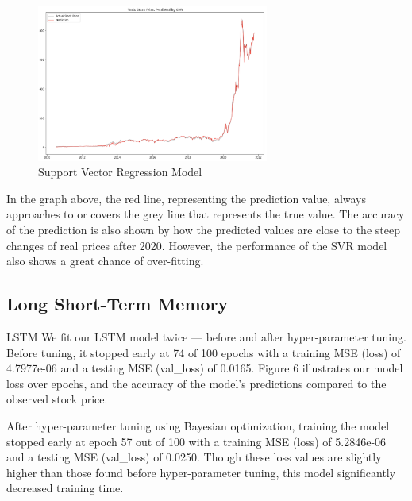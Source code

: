 \documentclass[12pt,a4paper]{article}
\begin{document}
\begin{figure}[h]
\caption{Support Vector Regression Model}
\centering
\includegraphics[width=3in]{./Figures/SVM.png}
\end{figure}

In the graph above, the red line, representing the prediction value, always approaches to or covers the grey line that represents the true value. The accuracy of the prediction is also shown by how the predicted values are close to the steep changes of real prices after 2020. However, the performance of the SVR model also shows a great chance of over-fitting.
\subsection{Long Short-Term Memory}

LSTM
We fit our LSTM model twice — before and after hyper-parameter tuning. Before tuning, it stopped early at 74 of 100 epochs with a training MSE (loss) of 4.7977e-06 and a testing MSE (val\_loss) of 0.0165. Figure 6 illustrates our model loss over epochs, and the accuracy of the model’s predictions compared to the observed stock price.

After hyper-parameter tuning using Bayesian optimization, training the model stopped early at epoch 57 out of 100 with a training MSE (loss) of 5.2846e-06 and a testing MSE (val\_loss) of 0.0250. Though these loss values are slightly higher than those found before hyper-parameter tuning, this model significantly decreased training time.
\end{document}
